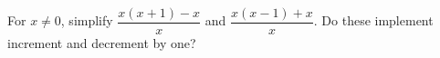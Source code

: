 For $x\ne0$, simplify $\dfrac{x(x+1)-x}{x}$ and $\dfrac{x(x-1)+x}{x}$. Do these implement increment and decrement by one?
